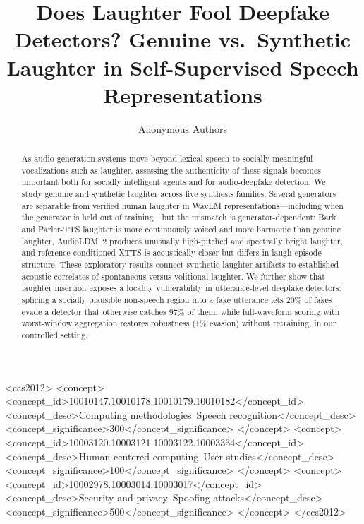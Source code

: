 \documentclass[sigconf,anonymous,review]{acmart}
\begin{document}
\title{Does Laughter Fool Deepfake Detectors? Genuine vs.\ Synthetic Laughter in Self-Supervised Speech Representations}

\author{Anonymous Authors}

\begin{abstract}
As audio generation systems move beyond lexical speech to socially meaningful vocalizations such as laughter, assessing the authenticity of these signals becomes important both for socially intelligent agents and for audio-deepfake detection. We study genuine and synthetic laughter across five synthesis families. Several generators are separable from verified human laughter in WavLM representations---including when the generator is held out of training---but the mismatch is generator-dependent: Bark and Parler-TTS laughter is more continuously voiced and more harmonic than genuine laughter, AudioLDM~2 produces unusually high-pitched and spectrally bright laughter, and reference-conditioned XTTS is acoustically closer but differs in laugh-episode structure. These exploratory results connect synthetic-laughter artifacts to established acoustic correlates of spontaneous versus volitional laughter. We further show that laughter insertion exposes a locality vulnerability in utterance-level deepfake detectors: splicing a socially plausible non-speech region into a fake utterance lets 20\% of fakes evade a detector that otherwise catches 97\% of them, while full-waveform scoring with worst-window aggregation restores robustness (1\% evasion) without retraining, in our controlled setting.
\end{abstract}

\begin{CCSXML}
<ccs2012>
<concept>
<concept_id>10010147.10010178.10010179.10010182</concept_id>
<concept_desc>Computing methodologies~Speech recognition</concept_desc>
<concept_significance>300</concept_significance>
</concept>
<concept>
<concept_id>10003120.10003121.10003122.10003334</concept_id>
<concept_desc>Human-centered computing~User studies</concept_desc>
<concept_significance>100</concept_significance>
</concept>
<concept>
<concept_id>10002978.10003014.10003017</concept_id>
<concept_desc>Security and privacy~Spoofing attacks</concept_desc>
<concept_significance>500</concept_significance>
</concept>
</ccs2012>
\end{CCSXML}

\end{document}
